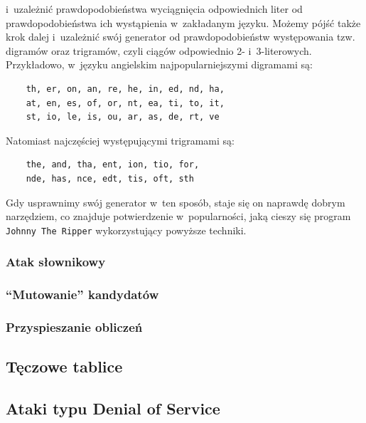 \documentclass[12pt,a4paper,twoside]{article}
\begin{document}
i~uzależnić prawdopodobieństwa wyciągnięcia odpowiednich liter od
prawdopodobieństwa ich wystąpienia w~zakładanym języku. Możemy pójść także krok
dalej i~uzależnić swój generator od prawdopodobieństw występowania tzw.
digramów oraz trigramów, czyli ciągów odpowiednio 2- i~3-literowych.
Przykładowo, w~języku angielskim najpopularniejszymi digramami są:
    \begin{center}
    \begin{BVerbatim}
    th, er, on, an, re, he, in, ed, nd, ha,
    at, en, es, of, or, nt, ea, ti, to, it,
    st, io, le, is, ou, ar, as, de, rt, ve
    \end{BVerbatim}
    \end{center}
Natomiast najczęściej występującymi trigramami są:
    \begin{center}
    \begin{BVerbatim}
    the, and, tha, ent, ion, tio, for,
    nde, has, nce, edt, tis, oft, sth
    \end{BVerbatim}
    \end{center}
Gdy usprawnimy swój generator w~ten sposób, staje się on naprawdę dobrym
narzędziem, co znajduje potwierdzenie w~popularności, jaką cieszy się program
\texttt{Johnny The Ripper} wykorzystujący powyższe techniki.



\subsubsection{Atak słownikowy}
\label{sec:dictionary_attacks}

\subsubsection{``Mutowanie'' kandydatów}

\subsubsection{Przyspieszanie obliczeń}

\subsection{Tęczowe tablice}

\subsection{Ataki typu Denial of Service}
\end{document}

